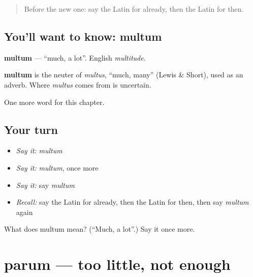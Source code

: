 \label{lesson:LA-C105-multum}



\begin{quote}
Before the new one: say the Latin for already, then the Latin for then.
\end{quote}

\subsection*{You'll want to know: multum}
\textbf{multum} — \textquotedblleft{}much, a lot\textquotedblright{}. English \emph{multitude}.

\begin{cousinweb}
\textbf{multum} is the neuter of \emph{multus}, \textquotedblleft{}much, many\textquotedblright{} (Lewis \& Short), used as an adverb. Where \emph{multus} comes from is uncertain.
\end{cousinweb}

\begin{grammarlens}[title={What you've built}]
One more word for this chapter.
\end{grammarlens}

\subsection*{Your turn}
\begin{itemize}
\raggedright
  \item \emph{Say it:} \emph{multum}
  \item \emph{Say it:} \emph{multum}, once more
  \item \emph{Say it:} say \emph{multum}
  \item \emph{Recall:} say the Latin for already, then the Latin for then, then say \emph{multum} again
\end{itemize}

\begin{tcolorbox}[breakable,colback=teal!4,colframe=teal!35!black,title={Before you move on}]
What does multum mean? (\textquotedblleft{}Much, a lot\textquotedblright{}.) Say it once more.
\end{tcolorbox}
\section[parum]{parum — too little, not enough}

\label{lesson:LA-C105-parum}



